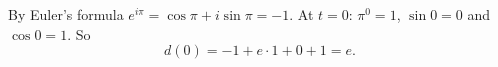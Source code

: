 By Euler's formula $e^{i\pi}=\cos\pi+i\sin\pi=-1$. At $t=0$: $\pi^0=1$, $\sin0=0$ and $\cos0=1$. So
\[d(0)=-1+e\cdot1+0+1=\boxed{e}.\]
